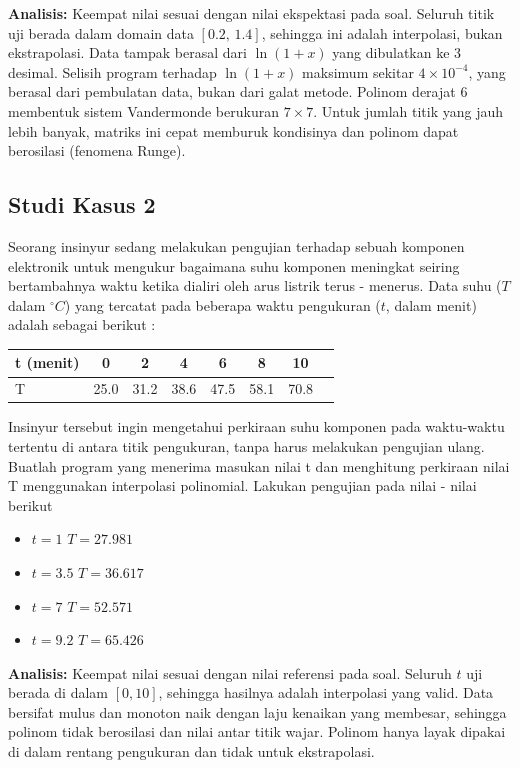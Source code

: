 \documentclass[12pt,a4paper]{report}
\begin{document}
\textbf{Analisis:} Keempat nilai sesuai dengan nilai ekspektasi pada soal. Seluruh titik uji berada dalam domain data $[0.2,\,1.4]$, sehingga ini adalah interpolasi, bukan ekstrapolasi. Data tampak berasal dari $\ln(1+x)$ yang dibulatkan ke 3 desimal. Selisih program terhadap $\ln(1+x)$ maksimum sekitar $4\times10^{-4}$, yang berasal dari pembulatan data, bukan dari galat metode. Polinom derajat 6 membentuk sistem Vandermonde berukuran $7\times7$. Untuk jumlah titik yang jauh lebih banyak, matriks ini cepat memburuk kondisinya dan polinom dapat berosilasi (fenomena Runge).

\subsection{Studi Kasus 2}

Seorang insinyur sedang melakukan pengujian terhadap sebuah komponen elektronik untuk mengukur
bagaimana suhu komponen meningkat seiring bertambahnya waktu ketika dialiri oleh arus listrik terus
- menerus. Data suhu ($T$ dalam $^\circ C$) yang tercatat pada beberapa waktu pengukuran ($t$, dalam menit)
adalah sebagai berikut :
 
\begin{center}
\begin{tabular}{|l|ccccccc|}
    \hline
    t (menit)    & 0   & 2   & 4  & 6 & 8   & 10    \\
    \hline
    T & 25.0 & 31.2 & 38.6 & 47.5 & 58.1 & 70.8 \\
    \hline
\end{tabular}
\end{center}

Insinyur tersebut ingin mengetahui perkiraan suhu komponen pada waktu-waktu tertentu di antara titik
pengukuran, tanpa harus melakukan pengujian ulang. Buatlah program yang menerima masukan nilai
t dan menghitung perkiraan nilai T menggunakan interpolasi polinomial.
Lakukan pengujian pada nilai - nilai berikut

\begin{itemize}
    \item $t = 1$ $T = 27.981$
    \item $t = 3.5$ $T = 36.617$
    \item $t = 7$ $T = 52.571$
    \item $t = 9.2$ $T = 65.426$
\end{itemize} 

\textbf{Analisis:} Keempat nilai sesuai dengan nilai referensi pada soal. Seluruh $t$ uji berada di dalam $[0,10]$, sehingga hasilnya adalah interpolasi yang valid. Data bersifat mulus dan monoton naik dengan laju kenaikan yang membesar, sehingga polinom tidak berosilasi dan nilai antar titik wajar. Polinom hanya layak dipakai di dalam rentang pengukuran dan tidak untuk ekstrapolasi.
\end{document}
